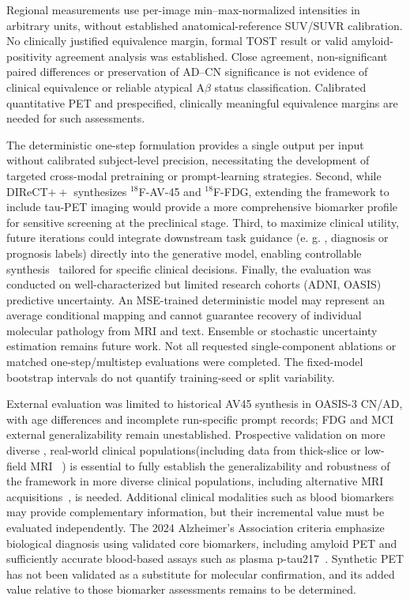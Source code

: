 \documentclass{article}
\providecommand{\DIFaddtex}[1]{{\protect\color{blue} \sf #1}} %
\providecommand{\DIFdeltex}[1]{{\protect\color{red} \scriptsize #1}} %
\providecommand{\DIFaddbegin}{} %
\providecommand{\DIFaddend}{} %
\providecommand{\DIFdelbegin}{} %
\providecommand{\DIFdelend}{} %
\providecommand{\DIFadd}[1]{\texorpdfstring{\DIFaddtex{#1}}{#1}} %
\providecommand{\DIFdel}[1]{\texorpdfstring{\DIFdeltex{#1}}{}} %
\newcommand{\DIFscaledelfig}{0.5}
\newlength{\DIFdelgraphicswidth} %
\newlength{\DIFdelgraphicsheight} %
\newcommand{\DIFaddincludegraphics}[2][]{{\color{blue}\fbox{\DIFOincludegraphics[#1]{#2}}}} %
\newcommand{\DIFdelincludegraphics}[2][]{%
\sbox{\DIFdelgraphicsbox}{\DIFOincludegraphics[#1]{#2}}%
\settoboxwidth{\DIFdelgraphicswidth}{\DIFdelgraphicsbox} %
\settoboxtotalheight{\DIFdelgraphicsheight}{\DIFdelgraphicsbox} %
\scalebox{\DIFscaledelfig}{%
\parbox[b]{\DIFdelgraphicswidth}{\usebox{\DIFdelgraphicsbox}\\[-\baselineskip] \rule{\DIFdelgraphicswidth}{0em}}\llap{\resizebox{\DIFdelgraphicswidth}{\DIFdelgraphicsheight}{%
\setlength{\unitlength}{\DIFdelgraphicswidth}%
\begin{picture}(1,1)%
\thicklines\linethickness{2pt} %
{\color[rgb]{1,0,0}\put(0,0){\framebox(1,1){}}}%
{\color[rgb]{1,0,0}\put(0,0){\line( 1,1){1}}}%
{\color[rgb]{1,0,0}\put(0,1){\line(1,-1){1}}}%
\end{picture}%
}\hspace*{3pt}}} %
} %
\DeclareRobustCommand{\DIFaddbegin}{\DIFOaddbegin \let\includegraphics\DIFaddincludegraphics} %
\DeclareRobustCommand{\DIFaddend}{\DIFOaddend \let\includegraphics\DIFOincludegraphics} %
\DeclareRobustCommand{\DIFdelbegin}{\DIFOdelbegin \let\includegraphics\DIFdelincludegraphics} %
\DeclareRobustCommand{\DIFdelend}{\DIFOaddend \let\includegraphics\DIFOincludegraphics} %
\begin{document}
\DIFadd{Regional measurements use per-image min--max-normalized intensities in arbitrary units, without established anatomical-reference SUV/SUVR calibration. No clinically justified equivalence margin, formal TOST result or valid amyloid-positivity agreement analysis was established. Close agreement, non-significant paired differences or preservation of AD--CN significance is not evidence of clinical equivalence or reliable atypical A$\beta$ status classification. Calibrated quantitative PET and prespecified, clinically meaningful equivalence margins are needed for such assessments.
}

\DIFadd{The deterministic one-step formulation provides a single output per input without calibrated }\DIFaddend subject-level \DIFdelbegin \DIFdel{precision, necessitating the development of targeted cross-modal pretraining or prompt-learning strategies. Second, while DIReCT$++$ synthesizes $^{18}$F-AV-45 and $^{18}$F-FDG, extending the framework to include tau-PET imaging would provide a more comprehensive biomarker profile for sensitive screening at the preclinical stage.
Third, to maximize clinical utility, future iterations could integrate downstream task guidance (e. g. , diagnosis or prognosis labels) directly into the generative model, enabling controllable synthesis~\cite{wang2025flexibly,chang2025controllable} tailored for specific clinical decisions.
Finally, the evaluation was conducted on well-characterized but limited research cohorts (ADNI, OASIS)}\DIFdelend \DIFaddbegin \DIFadd{predictive uncertainty. An MSE-trained deterministic model may represent an average conditional mapping and cannot guarantee recovery of individual molecular pathology from MRI and text. Ensemble or stochastic uncertainty estimation remains future work. Not all requested single-component ablations or matched one-step/multistep evaluations were completed. The fixed-model bootstrap intervals do not quantify training-seed or split variability.
}

\DIFadd{External evaluation was limited to historical AV45 synthesis in OASIS-3 CN/AD, with age differences and incomplete run-specific prompt records; FDG and MCI external generalizability remain unestablished}\DIFaddend . Prospective validation \DIFdelbegin \DIFdel{on more diverse , real-world clinical populations(including data from thick-slice or low-field MRI ~\cite{sorby2024portable}) is essential to fully establish the generalizability and robustness of the framework}\DIFdelend \DIFaddbegin \DIFadd{in more diverse clinical populations, including alternative MRI acquisitions~\cite{sorby2024portable}, is needed. Additional clinical modalities such as blood biomarkers~\cite{hansson2023blood} may provide complementary information, but their incremental value must be evaluated independently. The 2024 Alzheimer's Association criteria emphasize biological diagnosis using validated core biomarkers, including amyloid PET and sufficiently accurate blood-based assays such as plasma p-tau217~\cite{jack2024revised}. Synthetic PET has not been validated as a substitute for molecular confirmation, and its added value relative to those biomarker assessments remains to be determined}\DIFaddend .
\end{document}
